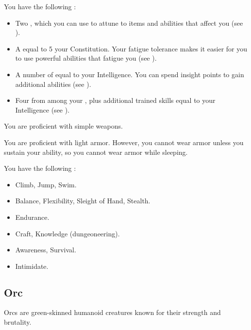              You have the following :
            \begin{itemize}
                \item Two , which you can use to attune to items and abilities that affect you (see ).
                \item A  equal to 5 \add your Constitution.
                    Your fatigue tolerance makes it easier for you to use powerful abilities that fatigue you (see ).
                \item A number of  equal to your Intelligence.
                    You can spend insight points to gain additional abilities (see ).
                \item Four  from among your , plus additional trained skills equal to your Intelligence (see ).
            \end{itemize}

            You are proficient with simple weapons.

            You are proficient with light armor.
            However, you cannot wear armor unless you sustain your  ability, so you cannot wear armor while sleeping.

            You have the following :
            \begin{itemize}
                \item {} Climb, Jump, Swim.
                \item {} Balance, Flexibility, Sleight of Hand, Stealth.
                \item {} Endurance.
                \item {} Craft, Knowledge (dungeoneering).
                \item {} Awareness, Survival.
                \item {} Intimidate.
            \end{itemize}

    \subsection{Orc}
        Orcs are green-skinned humanoid creatures known for their strength and brutality.

